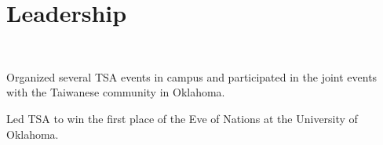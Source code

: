 \documentclass[letterpaper]{deedy-resume-openfont}
\begin{document}

\section{Leadership}

\\
\begin{tightemize}
\item Organized several TSA events in campus and participated in the joint events with the Taiwanese community in Oklahoma.
\item Led TSA to win the first place of the Eve of Nations at the University of Oklahoma.
\end{tightemize}
\sectionsep
\end{document}
